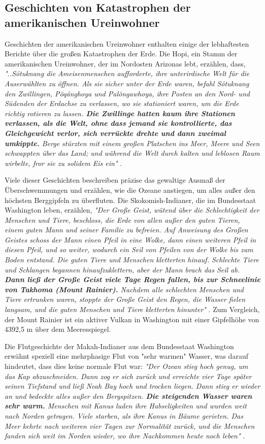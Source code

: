 \documentclass[10pt,twocolumn,letterpaper]{article}
\begin{document}
\subsection{Geschichten von Katastrophen der amerikanischen Ureinwohner}

Geschichten der amerikanischen Ureinwohner enthalten einige der lebhaftesten Berichte über die großen Katastrophen der Erde. Die Hopi, ein Stamm der amerikanischen Ureinwohner, der im Nordosten Arizonas lebt, erzählen, dass, \textit{"..Sótuknang die Ameisenmenschen aufforderte, ihre unterirdische Welt für die Auserwählten zu öffnen. Als sie sicher unter der Erde waren, befahl Sótuknang den Zwillingen, Pöqánghoya und Palöngawhoya, ihre Posten an den Nord- und Südenden der Erdachse zu verlassen, wo sie stationiert waren, um die Erde richtig rotieren zu lassen. \textbf{Die Zwillinge hatten kaum ihre Stationen verlassen, als die Welt, ohne dass jemand sie kontrollierte, das Gleichgewicht verlor, sich verrückte drehte und dann zweimal umkippte.} Berge stürzten mit einem großen Platschen ins Meer, Meere und Seen schwappten über das Land; und während die Welt durch kalten und leblosen Raum wirbelte, fror sie zu solidem Eis ein"} \cite{4}.

Viele dieser Geschichten beschreiben präzise das gewaltige Ausmaß der Überschwemmungen und erzählen, wie die Ozeane anstiegen, um alles außer den höchsten Berggipfeln zu überfluten. Die Skokomish-Indianer, die im Bundesstaat Washington leben, erzählen, \textit{"Der Große Geist, wütend über die Schlechtigkeit der Menschen und Tiere, beschloss, die Erde von allen außer den guten Tieren, einem guten Mann und seiner Familie zu befreien. Auf Anweisung des Großen Geistes schoss der Mann einen Pfeil in eine Wolke, dann einen weiteren Pfeil in diesen Pfeil, und so weiter, wodurch ein Seil von Pfeilen von der Wolke bis zum Boden entstand. Die guten Tiere und Menschen kletterten hinauf. Schlechte Tiere und Schlangen begannen hinaufzuklettern, aber der Mann brach das Seil ab. \textbf{Dann ließ der Große Geist viele Tage Regen fallen, bis zur Schneelinie von Takhoma (Mount Rainier).} Nachdem alle schlechten Menschen und Tiere ertrunken waren, stoppte der Große Geist den Regen, die Wasser fielen langsam, und die guten Menschen und Tiere kletterten hinunter"} \cite{3}. Zum Vergleich, der Mount Rainier ist ein aktiver Vulkan in Washington mit einer Gipfelhöhe von 4392,5 m über dem Meeresspiegel.

Die Flutgeschichte der Makah-Indianer aus dem Bundesstaat Washington erwähnt speziell eine mehrphasige Flut von "sehr warmen" Wasser, was darauf hindeutet, dass dies keine normale Flut war: \textit{"Der Ozean stieg hoch genug, um das Kap abzuschneiden. Dann zog er sich zurück und erreichte vier Tage später seinen Tiefstand und ließ Neah Bay hoch und trocken liegen. Dann stieg er wieder an und bedeckte alles außer den Bergspitzen. \textbf{Die steigenden Wasser waren sehr warm.} Menschen mit Kanus luden ihre Habseligkeiten und wurden weit nach Norden getragen. Viele starben, als ihre Kanus in Bäume gerieten. Das Meer kehrte nach weiteren vier Tagen zur Normalität zurück, und die Menschen fanden sich weit im Norden wieder, wo ihre Nachkommen heute noch leben"} \cite{3}.
\end{document}
